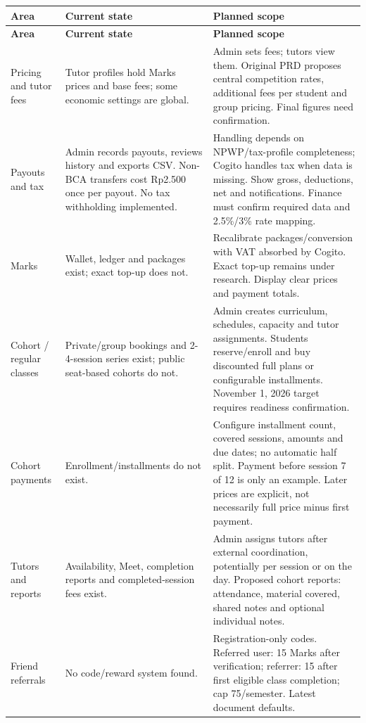 \documentclass[11pt,a4paper]{article}
\begin{document}
{\small
\begin{longtable}{|L{28.54mm}|L{52.57mm}|L{69.09mm}|}
\hline
\textbf{Area} & \textbf{Current state} & \textbf{Planned scope} \\ \hline
\endfirsthead
\hline
\textbf{Area} & \textbf{Current state} & \textbf{Planned scope} \\ \hline
\endhead
Pricing and tutor fees & Tutor profiles hold Marks prices and base fees; some economic settings are global. & Admin sets fees; tutors view them. Original PRD proposes central competition rates, additional fees per student and group pricing. Final figures need confirmation. \\ \hline
Payouts and tax & Admin records payouts, reviews history and exports CSV. Non-BCA transfers cost Rp2.500 once per payout. No tax withholding implemented. & Handling depends on NPWP/\allowbreak{}tax-profile completeness; Cogito handles tax when data is missing. Show gross, deductions, net and notifications. Finance must confirm required data and 2.5\%/\allowbreak{}3\% rate mapping. \\ \hline
Marks & Wallet, ledger and packages exist; exact top-up does not. & Recalibrate packages/\allowbreak{}conversion with VAT absorbed by Cogito. Exact top-up remains under research. Display clear prices and payment totals. \\ \hline
Cohort /\allowbreak{} regular classes & Private/\allowbreak{}group bookings and 2-4-session series exist; public seat-based cohorts do not. & Admin creates curriculum, schedules, capacity and tutor assignments. Students reserve/\allowbreak{}enroll and buy discounted full plans or configurable installments. November 1, 2026 target requires readiness confirmation. \\ \hline
Cohort payments & Enrollment/\allowbreak{}installments do not exist. & Configure installment count, covered sessions, amounts and due dates; no automatic half split. Payment before session 7 of 12 is only an example. Later prices are explicit, not necessarily full price minus first payment. \\ \hline
Tutors and reports & Availability, Meet, completion reports and completed-session fees exist. & Admin assigns tutors after external coordination, potentially per session or on the day. Proposed cohort reports: attendance, material covered, shared notes and optional individual notes. \\ \hline
Friend referrals & No code/\allowbreak{}reward system found. & Registration-only codes. Referred user: 15 Marks after verification; referrer: 15 after first eligible class completion; cap 75/\allowbreak{}semester. Latest document defaults. \\ \hline

\end{longtable}}
\end{document}
